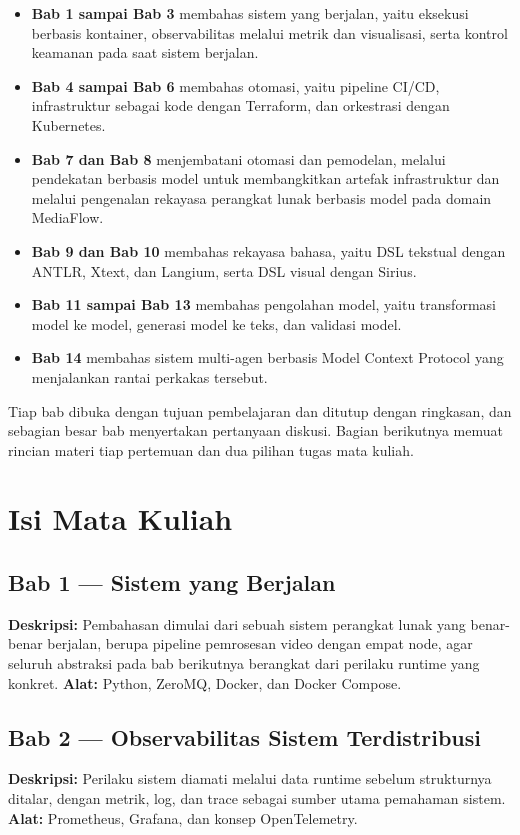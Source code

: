 \begin{itemize}
  \item \textbf{Bab 1 sampai Bab 3} membahas sistem yang berjalan, yaitu
        eksekusi berbasis kontainer, observabilitas melalui metrik dan
        visualisasi, serta kontrol keamanan pada saat sistem berjalan.
  \item \textbf{Bab 4 sampai Bab 6} membahas otomasi, yaitu pipeline CI/CD,
        infrastruktur sebagai kode dengan Terraform, dan orkestrasi dengan
        Kubernetes.
  \item \textbf{Bab 7 dan Bab 8} menjembatani otomasi dan pemodelan, melalui
        pendekatan berbasis model untuk membangkitkan artefak infrastruktur dan
        melalui pengenalan rekayasa perangkat lunak berbasis model pada domain
        MediaFlow.
  \item \textbf{Bab 9 dan Bab 10} membahas rekayasa bahasa, yaitu DSL tekstual
        dengan ANTLR, Xtext, dan Langium, serta DSL visual dengan Sirius.
  \item \textbf{Bab 11 sampai Bab 13} membahas pengolahan model, yaitu
        transformasi model ke model, generasi model ke teks, dan validasi model.
  \item \textbf{Bab 14} membahas sistem multi-agen berbasis Model Context
        Protocol yang menjalankan rantai perkakas tersebut.
\end{itemize}

Tiap bab dibuka dengan tujuan pembelajaran dan ditutup dengan ringkasan, dan
sebagian besar bab menyertakan pertanyaan diskusi. Bagian berikutnya memuat
rincian materi tiap pertemuan dan dua pilihan tugas mata kuliah.

\section*{Isi Mata Kuliah}

\subsection*{Bab 1 --- Sistem yang Berjalan}
\textbf{Deskripsi:} Pembahasan dimulai dari sebuah sistem perangkat lunak yang benar-benar berjalan, berupa pipeline pemrosesan video dengan empat node, agar seluruh abstraksi pada bab berikutnya berangkat dari perilaku runtime yang konkret.
\textbf{Alat:} Python, ZeroMQ, Docker, dan Docker Compose.

\subsection*{Bab 2 --- Observabilitas Sistem Terdistribusi}
\textbf{Deskripsi:} Perilaku sistem diamati melalui data runtime sebelum strukturnya ditalar, dengan metrik, log, dan trace sebagai sumber utama pemahaman sistem.
\textbf{Alat:} Prometheus, Grafana, dan konsep OpenTelemetry.

